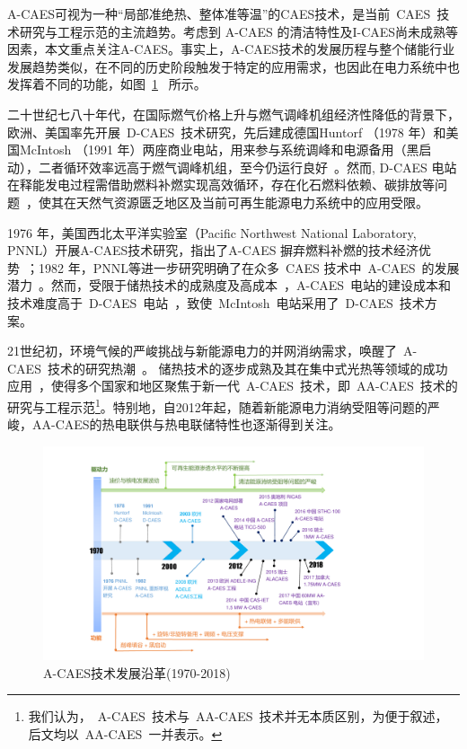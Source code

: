 A-CAES可视为一种“局部准绝热、整体准等温”的CAES技术\cite{Thesis-Zhangxuelin}，是当前~CAES~技术研究与工程示范的主流趋势。考虑到 A-CAES 的清洁特性及I-CAES尚未成熟等因素，本文重点关注A-CAES。事实上，A-CAES技术的发展历程与整个储能行业发展趋势类似，在不同的历史阶段触发于特定的应用需求，也因此在电力系统中也发挥着不同的功能，如图~\ref{fig:CAES-History}~ 所示。

二十世纪七八十年代，在国际燃气价格上升与燃气调峰机组经济性降低的背景下，欧洲、美国率先开展~D-CAES~技术研究，先后建成德国Huntorf （1978 年）和美国McIntosh （1991 年）两座商业电站，用来参与系统调峰和电源备用（黑启动），二者循环效率远高于燃气调峰机组，至今仍运行良好~\cite{IEA-EES-09,EES-Review-12}。然而, D-CAES 电站在释能发电过程需借助燃料补燃实现高效循环，存在化石燃料依赖、碳排放等问题~\cite{ACAES-Green-12,CAES-Huntorf-12}，使其在天然气资源匮乏地区及当前可再生能源电力系统中的应用受限。

1976 年，美国西北太平洋实验室（Pacific Northwest National Laboratory, PNNL）开展A-CAES技术研究，指出了A-CAES 摒弃燃料补燃的技术经济优势~\cite{CAES-Patent-78,Thesis-Zhangyuan}；1982 年，PNNL等进一步研究明确了在众多~CAES 技术中~A-CAES~的发展潜力~\cite{A-CAES-Report-81,A-CAES-Report-82}。然而，受限于储热技术的成熟度及高成本~\cite{AA-CAES-04}，A-CAES~电站的建设成本和技术难度高于~D-CAES~电站~\cite{Thesis-Zhangyuan}，致使~McIntosh~电站采用了~D-CAES~技术方案。

21世纪初，环境气候的严峻挑战与新能源电力的并网消纳需求，唤醒了~A-CAES~技术的研究热潮~\cite{AA-CAES-04}。 储热技术的逐步成熟及其在集中式光热等领域的成功应用~\cite{TES-CSP-review-13}，使得多个国家和地区聚焦于新一代~A-CAES~技术，即~AA-CAES~技术的研究与工程示范\footnote{我们认为，~A-CAES~技术与~AA-CAES~技术并无本质区别，为便于叙述，后文均以~AA-CAES~一并表示。}。特别地，自2012年起，随着新能源电力消纳受阻等问题的严峻，AA-CAES的热电联供与热电联储特性也逐渐得到关注。

\begin{figure}[H] %
  \centering
  \includegraphics[scale=0.60]{figures/Chap1-4-CAES-History.pdf}
  \caption{A-CAES技术发展沿革(1970-2018)}
  \label{fig:CAES-History}
\end{figure}

